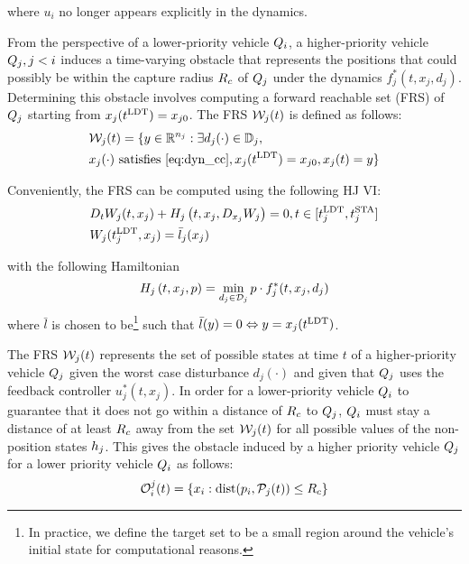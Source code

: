 \noindent where $u_i$ no longer appears explicitly in the dynamics.

From the perspective of a lower-priority vehicle $Q_i$, a higher-priority vehicle $Q_j, j < i$ induces a time-varying obstacle that represents the positions that could possibly be within the capture radius $R_c$ of $Q_j$ under the dynamics $f^*_j(t, x_j, d_j)$. Determining this obstacle involves computing a forward reachable set (FRS) of $Q_j$ starting from $x_j(t^\text{LDT}) = x_{j0}$. The FRS $\mathcal{W}_j(t)$ is defined as follows:
\vspace{-0.3em}
\begin{equation}
\label{eq:FRS1}
\begin{aligned}
&\mathcal{W}_j(t) = \{y \in \mathbb{R}^{n_j}: \exists d_j(\cdot) \in \mathbb{D}_j, \\
&x_j(\cdot) \text{ satisfies \eqref{eq:dyn_cc}}, x_j(t^\text{LDT}) = x_{j0}, x_j(t) = y\}
\end{aligned}
\end{equation}

Conveniently, the FRS can be computed using the following HJ VI:
\vspace{-0.4em}
\begin{equation}
\label{eq:FRS_HJIVI}
\begin{aligned}
&D_t W_j(t, x_j) + H_j\left(t, x_j, D_{x_j} W_j\right) = 0, t \in [t^\text{LDT}_j, t^\text{STA}_j]\\
&W_j(t^\text{LDT}_j, x_j) = \bar l_j(x_j) \\
\end{aligned}
\end{equation}

\noindent with the following Hamiltonian
\begin{equation}
H_j\left(t, x_j, p\right) = \min_{d_j \in \mathcal{D}_j} p \cdot f^*_j(t, x_j, d_j)
\end{equation}
\noindent where $\bar l$ is chosen to be\footnote{In practice, we define the target set to be a small region around the vehicle's initial state for computational reasons.} such that $\bar l (y) = 0 \Leftrightarrow y = x_j(t^\text{LDT})$.

The FRS $\mathcal{W}_j(t)$ represents the set of possible states at time $t$ of a higher-priority vehicle $Q_j$ given the worst case disturbance $d_j(\cdot)$ and given that $Q_j$ uses the feedback controller $u_j^*(t, x_j)$. In order for a lower-priority vehicle $Q_i$ to guarantee that it does not go within a distance of $R_c$ to $Q_j$, $Q_i$ must stay a distance of at least $R_c$ away from the set $\mathcal{W}_j(t)$ for all possible values of the non-position states $h_j$. This gives the obstacle induced by a higher priority vehicle $Q_j$ for a lower priority vehicle $Q_i$ as follows:
\vspace{-0.4em}
\begin{equation}
\mathcal{O}_i^j(t) = \{x_i: \text{dist}(p_i, \mathcal{P}_j(t)) \le R_c \}
\end{equation}

